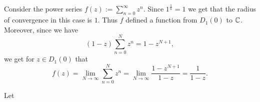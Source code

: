 \documentclass[11pt,a4paper]{article}
\begin{document}
\begin{example}
  Consider the power series $f(z) := \sum_{n=0}^{\infty} z^n$.
  Since $1^{\frac 1n} = 1$ we get that the radius of convergence in
  this case is $1$.
  Thus $f$ defined a function from $D_1(0)$ to $\mathbb{C}$.
  Moreover, since we have
  \[
    (1 - z) \sum_{n=0}^{N} z^n = 1 - z^{N + 1},
  \]
  we get for $z \in D_1(0)$ that
  \[
    f(z) =
    \lim_{N \to \infty} \sum_{n=0}^{N} z^n =
    \lim_{N \to \infty} \frac{1 - z^{N + 1}}{1 - z} =
    \frac{1}{1 - z}.
  \]
\end{example}

\begin{proposition}
  Let 
\end{proposition}
\end{document}
